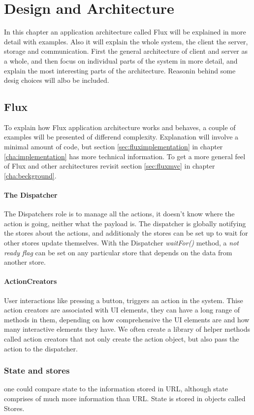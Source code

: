 \chapter{Design and Architecture}
In this chapter an application architecture called Flux will be explained in more detail with examples.  Also it will explain the whole system, the client the server, storage and communication. First the general architecture of client and server as a whole, and then focus on individual parts of the system in more detail, and explain the most interesting parts of the architecture. Reasonin behind some desig choices will albo be included.

\section{Flux}
To explain how Flux application architecture works and behaves, a couple of examples will be presented of differend complexity. Explanation will involve a minimal amount of code, but section \ref{sec:fluximplementation} in chapter \ref{cha:implementation} has more technical information. To get a more general feel of Flux and other architectures revisit section \ref{sec:fluxmvc} in chapter \ref{cha:beckground}.
\subsubsection{The Dispatcher }
The Dispatchers role is to manage all the actions, it doesn't know where the action is going, neither what the payload is. The dispatcher is globally notifying the stores about the actions, and additionaly the stores can be set up to wait for other stores update themselves. With the Dispatcher \emph{waitFor()} method, a \emph{not ready flag} can be set on any particular store that depends on the data from another store. 
\subsubsection{ActionCreators }
User interactions like pressing a button, triggers an action in the system. Thise action creators are associated with UI elements, they can have a long range of methods in them, depending on how comprehensive the UI elements are and how many interactive elements they have. 
We often create a library of helper methods called action creators that not only create the action object, but also pass the action to the dispatcher.
\subsection{State and stores }
one could compare state to the information stored in URL, although state comprises of much more information than URL.
State is stored in objects called Stores.

